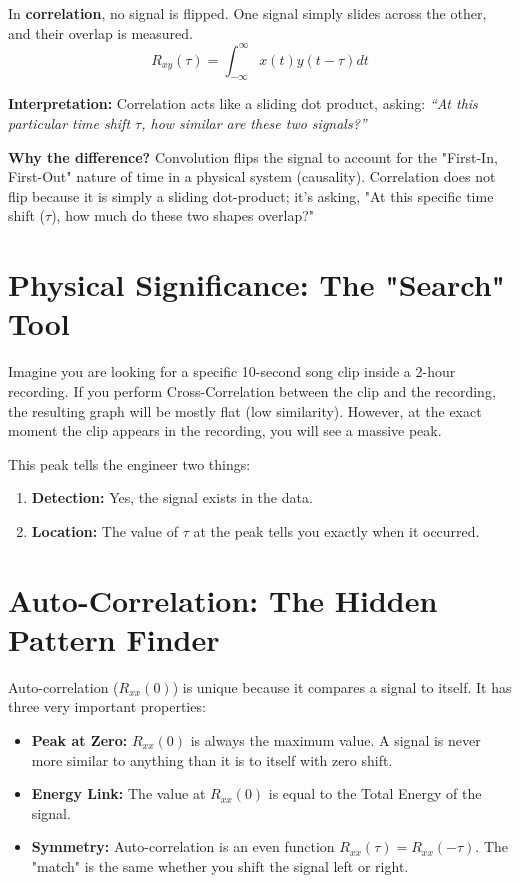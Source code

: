 \documentclass[12pt,a4paper]{article}
\begin{document}
In \textbf{correlation}, no signal is flipped. One signal simply slides across the other, and their overlap is measured.
\[ R_{xy}(\tau) = \int_{-\infty}^{\infty} x(t) y(t-\tau) dt \]

\textbf{Interpretation:}
Correlation acts like a sliding dot product, asking: \textit{“At this particular time shift \(\tau\), how similar are these two signals?”}

\textbf{Why the difference?} Convolution flips the signal to account for the "First-In, First-Out" nature of time in a physical system (causality). Correlation does not flip because it is simply a sliding dot-product; it's asking, "At this specific time shift (\(\tau\)), how much do these two shapes overlap?"

\section*{Physical Significance: The "Search" Tool}
Imagine you are looking for a specific 10-second song clip inside a 2-hour recording. If you perform Cross-Correlation between the clip and the recording, the resulting graph will be mostly flat (low similarity). However, at the exact moment the clip appears in the recording, you will see a massive peak.

This peak tells the engineer two things:
\begin{enumerate}
    \item \textbf{Detection:} Yes, the signal exists in the data.
    \item \textbf{Location:} The value of \(\tau\) at the peak tells you exactly when it occurred.
\end{enumerate}

\section*{Auto-Correlation: The Hidden Pattern Finder}
Auto-correlation (\(R_{xx}(0)\)) is unique because it compares a signal to itself. It has three very important properties:
\begin{itemize}
    \item \textbf{Peak at Zero:} \(R_{xx}(0)\) is always the maximum value. A signal is never more similar to anything than it is to itself with zero shift.
    \item \textbf{Energy Link:} The value at \(R_{xx}(0)\) is equal to the Total Energy of the signal.
    \item \textbf{Symmetry:} Auto-correlation is an even function \(R_{xx}(\tau) = R_{xx}(-\tau)\). The "match" is the same whether you shift the signal left or right.
\end{itemize}
\end{document}

